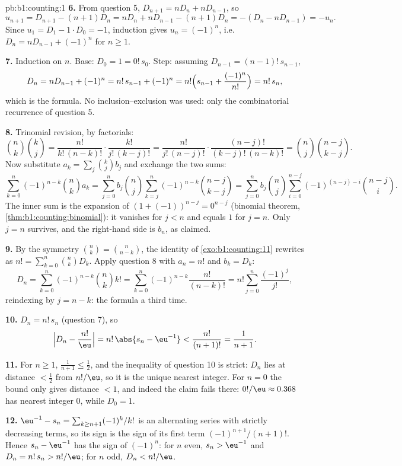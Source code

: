 \begin{solution}{pb:b1:counting:1}
\textbf{6.} From question 5, $D_{n+1} = nD_n + nD_{n-1}$, so
\[
u_{n+1} = D_{n+1} - (n+1)D_n = nD_n + nD_{n-1} - (n+1)D_n
= -(D_n - nD_{n-1}) = -u_n .
\]
Since $u_1 = D_1 - 1 \cdot D_0 = -1$, induction gives $u_n =
(-1)^n$, i.e.\ $D_n = nD_{n-1} + (-1)^n$ for $n \geq 1$.

\textbf{7.} Induction on $n$. Base: $D_0 = 1 = 0!\,s_0$. Step:
assuming $D_{n-1} = (n-1)!\,s_{n-1}$,
\[
D_n = nD_{n-1} + (-1)^n = n!\,s_{n-1} + (-1)^n
= n!\Bigl(s_{n-1} + \frac{(-1)^n}{n!}\Bigr) = n!\,s_n ,
\]
which is the formula. No inclusion--exclusion was used: only the
combinatorial recurrence of question 5.

\textbf{8.} Trinomial revision, by factorials:
\[
\binom nk \binom kj
= \frac{n!}{k!\,(n-k)!} \cdot \frac{k!}{j!\,(k-j)!}
= \frac{n!}{j!\,(n-j)!} \cdot \frac{(n-j)!}{(k-j)!\,(n-k)!}
= \binom nj \binom{n-j}{k-j} .
\]
Now substitute $a_k = \sum_j \binom kj b_j$ and exchange the two
 sums:
\[
\sum_{k=0}^{n} (-1)^{n-k} \binom nk a_k
= \sum_{j=0}^{n} b_j \binom nj
\sum_{k=j}^{n} (-1)^{n-k} \binom{n-j}{k-j}
= \sum_{j=0}^{n} b_j \binom nj
\sum_{i=0}^{n-j} (-1)^{(n-j)-i} \binom{n-j}{i} .
\]
The inner sum is the expansion of $(1 + (-1))^{n-j} = 0^{n-j}$
(binomial theorem, \cref{thm:b1:counting:binomial}): it vanishes
for $j < n$ and equals $1$ for $j = n$. Only $j = n$ survives, and
the right-hand side is $b_n$, as claimed.

\textbf{9.} By the symmetry $\binom nk = \binom n{n-k}$, the
identity of \cref{exo:b1:counting:11} rewrites as $n! =
\sum_{k=0}^n \binom nk D_k$. Apply question 8 with $a_n = n!$ and
$b_k = D_k$:
\[
D_n = \sum_{k=0}^{n} (-1)^{n-k} \binom nk k!
= \sum_{k=0}^{n} (-1)^{n-k} \frac{n!}{(n-k)!}
= n! \sum_{j=0}^{n} \frac{(-1)^j}{j!} ,
\]
reindexing by $j = n - k$: the formula a third time.

\textbf{10.} $D_n = n!\,s_n$ (question 7), so
\[
\Bigl| D_n - \frac{n!}{\eu} \Bigr|
= n!\,\abs{s_n - \eu^{-1}} < \frac{n!}{(n+1)!} = \frac1{n+1} .
\]

\textbf{11.} For $n \geq 1$, $\frac1{n+1} \leq \frac12$, and the
inequality of question 10 is strict: $D_n$ lies at distance
$< \frac12$ from $n!/\eu$, so it is the unique nearest integer. For
$n = 0$ the bound only gives distance $< 1$, and indeed the claim
fails there: $0!/\eu \approx 0.368$ has nearest integer $0$, while
$D_0 = 1$.

\textbf{12.} $\eu^{-1} - s_n = \sum_{k \geq n+1} (-1)^k/k!$ is an
alternating series with strictly decreasing terms, so its sign is
the sign of its first term $(-1)^{n+1}/(n+1)!$. Hence $s_n -
\eu^{-1}$ has the sign of $(-1)^n$: for $n$ even, $s_n > \eu^{-1}$
and $D_n = n!\,s_n > n!/\eu$; for $n$ odd, $D_n < n!/\eu$.


\end{solution}
